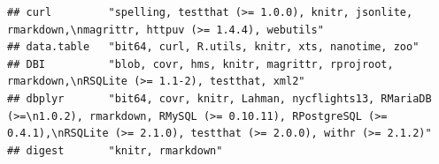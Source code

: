 \documentclass[]{article}
\begin{document}
\begin{verbatim}
## curl         "spelling, testthat (>= 1.0.0), knitr, jsonlite, rmarkdown,\nmagrittr, httpuv (>= 1.4.4), webutils"                                                                                                                                                                                                                                                                                                                                                                                                                                                                                       
## data.table   "bit64, curl, R.utils, knitr, xts, nanotime, zoo"                                                                                                                                                                                                                                                                                                                                                                                                                                                                                                                                         
## DBI          "blob, covr, hms, knitr, magrittr, rprojroot, rmarkdown,\nRSQLite (>= 1.1-2), testthat, xml2"                                                                                                                                                                                                                                                                                                                                                                                                                                                                                             
## dbplyr       "bit64, covr, knitr, Lahman, nycflights13, RMariaDB (>=\n1.0.2), rmarkdown, RMySQL (>= 0.10.11), RPostgreSQL (>= 0.4.1),\nRSQLite (>= 2.1.0), testthat (>= 2.0.0), withr (>= 2.1.2)"                                                                                                                                                                                                                                                                                                                                                                                                      
## digest       "knitr, rmarkdown"                                                                                                                                                                                                                                                                                                                                                                                                                                                                                                                                                                        

\end{verbatim}
\end{document}

